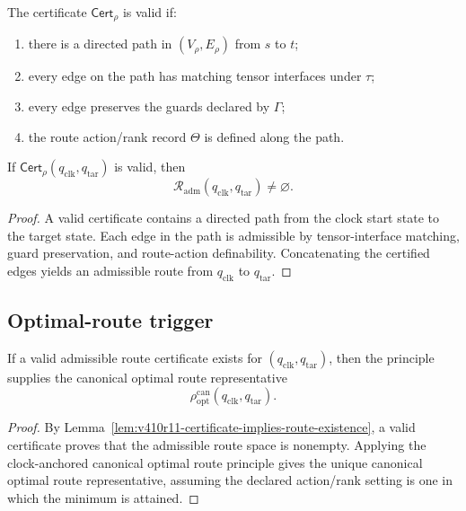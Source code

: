 \begin{definition}
\label{def:v410r11-certificate-validity}
The certificate \(\mathsf{Cert}_{\rho}\) is valid if:
\begin{enumerate}[leftmargin=*]
 \item there is a directed path in \((V_{\rho},E_{\rho})\) from \(s\) to \(t\);
 \item every edge on the path has matching tensor interfaces under \(\tau\);
 \item every edge preserves the guards declared by \(\Gamma\);
 \item the route action/rank record \(\Theta\) is defined along the path.
\end{enumerate}
\end{definition}

\begin{lemma}
\label{lem:v410r11-certificate-implies-route-existence}
If \(\mathsf{Cert}_{\rho}(q_{\mathrm{clk}},q_{\mathrm{tar}})\) is valid, then
\[
 \mathcal R_{\mathrm{adm}}(q_{\mathrm{clk}},q_{\mathrm{tar}})
 \neq\varnothing.
\]
\end{lemma}

\begin{proof}
A valid certificate contains a directed path from the clock start state to the
target state. Each edge in the path is admissible by tensor-interface matching,
guard preservation, and route-action definability. Concatenating the certified
edges yields an admissible route from \(q_{\mathrm{clk}}\) to \(q_{\mathrm{tar}}\).
\end{proof}

\subsection{Optimal-route trigger}
\label{subsec:v410r11-optimal-route-trigger}

\begin{theorem}
\label{thm:v410r11-certificate-triggers-canonical-optimal-route}
If a valid admissible route certificate exists for
\((q_{\mathrm{clk}},q_{\mathrm{tar}})\), then the principle supplies the
canonical optimal route representative
\[
 \rho_{\mathrm{opt}}^{\mathrm{can}}
 (q_{\mathrm{clk}},q_{\mathrm{tar}}).
\]
\end{theorem}

\begin{proof}
By Lemma~\ref{lem:v410r11-certificate-implies-route-existence}, a valid
certificate proves that the admissible route space is nonempty. Applying the
clock-anchored canonical optimal route principle gives the unique canonical
optimal route representative, assuming the declared action/rank setting is one
in which the minimum is attained.
\end{proof}

